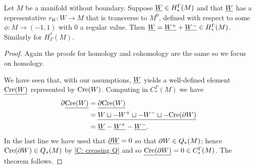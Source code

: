 \begin{theorem}\label{T: cohomology creasing}
	Let $M$ be a manifold without boundary.
	Suppose $\underline{W} \in H_*^\Gamma(M)$ and that $\underline{W}$ has a representative $r_W \colon W \to M$ that is transverse to $M^0$, defined with respect to some $\phi \colon M \to (-1,1)$ with $0$ a regular value.
	Then $\underline{W} = \underline{W^+} + \underline{W^-} \in H_*^\Gamma(M)$.
	Similarly for $H^*_\Gamma(M)$.
\end{theorem}

\begin{proof}
	Again the proofs for homology and cohomology are the same so we focus on homology.

	We have seen that, with our assumptions, $\underline{W}$ yields a well-defined element $\underline{\mathrm{Cre}(W)}$ represented by $\mathrm{Cre}(W)$.
	Computing in $C_*^\Gamma(M)$ we have
	\begin{align*}
		\partial \underline{\mathrm{Cre}(W)}& = \underline{\partial \mathrm{Cre}(W) }\\
		& = \underline{W \sqcup -W^+ \sqcup -W^- \sqcup -\mathrm{Cre}(\partial W)}\\
		& = \underline{W} -\underline{W^+}-\underline{W^-}.
	\end{align*}
	In the last line we have used that $\underline{\partial W} = 0$ so that $\partial W \in Q_*(M)$; hence $\mathrm{Cre}(\partial W) \in Q_*(M)$ by \cref{C: creasing Q} and so $\underline{\mathrm{Cre}(\partial W)} = 0 \in C_*^\Gamma(M)$.
	The theorem follows.
\end{proof}

\begin{comment}
	Let $f \colon W \to \R$ and $p$ be a regular value of $f$.
	Define $W^+$ to be $f^{-1} [p, \infty)$ and $W^-$ to be $f^{-1} (-\infty, p]$.
	By Theorem~1 of \cite{Lipy14} (and
	also transversality as developed in in Section 6 of \cite{Joy12}), $W^+$ and $W^-$ are manifolds with corners.
	The following is Lemma~9 of \cite{Lipy14}.

	\begin{proposition}\label{P: creasing}
		Let $f \colon W \to \R$ and $p$ be a regular value of $f$.
		There is a manifold-with corners structure on the topological manifold $W \times [0,1]$, called the creasing of $W$ at $p$,
		whose boundary is the disjoint union of $W$ with its orientation
		reversed, $W^+$, $W^-$ and the creasing of ${\bd W}$ at $p$.
	\end{proposition}

	We denote the creasing of $W$ at $p$ by $\Cre(W)$, suppressing $f$ and $p$ from notation.
	See Figure~\ref{F: creasing} for a sketch of a creasing of the teardrop manifold.
\end{comment}